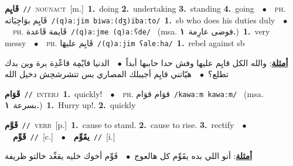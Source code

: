 \documentclass[10pt,a4paper,twoside]{article} %
\begin{document}
\begin{multicols}{2}
{\setlength\topsep{0pt}\textbf{\foreignlanguage{arabic}{قَايِم}}\ {\color{gray}\texttt{//}\color{black}}\ \textsc{noun\textunderscore act}\ [m.]\ \textbf{1.}~doing  \textbf{2.}~undertaking  \textbf{3.}~standing  \textbf{4.}~going\ \ $\bullet$\ \ \textsc{ph.} \color{gray} \foreignlanguage{arabic}{قَايِم بوَاجِبَاته}\color{black}\ {\color{gray}\texttt{/{\sffamily (q)aːjim biwaː(dʒ)ibaːto}/}\color{black}}\ \textbf{1.}~sb who does his duties duly\ \ $\bullet$\ \ \textsc{ph.} \color{gray} \foreignlanguage{arabic}{قَايمة قَاعدة}\color{black}\ {\color{gray}\texttt{/{\sffamily (q)aːjme (q)aːʕde}/}\color{black}}\ \color{gray} (msa. \foreignlanguage{arabic}{فوضى عارِمة}~\foreignlanguage{arabic}{\textbf{١.}})\color{black}\ \textbf{1.}~very messy\ \ $\bullet$\ \ \textsc{ph.} \color{gray} \foreignlanguage{arabic}{قَايِم عليهَا}\color{black}\ {\color{gray}\texttt{/{\sffamily (q)aːjim ʕaleːha}/}\color{black}}\ \textbf{1.}~rebel against sb\  \begin{flushright}\color{gray}\foreignlanguage{arabic}{\textbf{\underline{\foreignlanguage{arabic}{أمثلة}}}: والله الكل قايِم عليها وفش حدا حاببها أبداً\ $\bullet$\ \  الدنيا قايْمِة قاعْدِة برة وين بدك تطلع؟\ $\bullet$\ \  هيّاتني قايِم أجيبلك المصاري بس تتشرشحِش دخيل الله}\end{flushright}\color{black}} \vspace{2mm}

{\setlength\topsep{0pt}\textbf{\foreignlanguage{arabic}{قَوَام}}\ {\color{gray}\texttt{//}\color{black}}\ \textsc{interj}\ \textbf{1.}~quickly!\ \ $\bullet$\ \ \textsc{ph.} \color{gray} \foreignlanguage{arabic}{قوَام قوَام}\color{black}\ {\color{gray}\texttt{/{\sffamily kawaːm kawaːm}/}\color{black}}\ \color{gray} (msa. \foreignlanguage{arabic}{بسرعة}~\foreignlanguage{arabic}{\textbf{١.}})\color{black}\ \textbf{1.}~Hurry up!.  \textbf{2.}~quickly\ } \vspace{2mm}

{\setlength\topsep{0pt}\textbf{\foreignlanguage{arabic}{قَوَّم}}\ {\color{gray}\texttt{//}\color{black}}\ \textsc{verb}\ [p.]\ \textbf{1.}~cause to stand.  \textbf{2.}~cause to rise.  \textbf{3.}~rectify\ \ $\bullet$\ \ \setlength\topsep{0pt}\textbf{\foreignlanguage{arabic}{قَوِّم}}\ {\color{gray}\texttt{//}\color{black}}\ [c.]\ \ $\bullet$\ \ \setlength\topsep{0pt}\textbf{\foreignlanguage{arabic}{يقَوِّم}}\ {\color{gray}\texttt{//}\color{black}}\ [i.]\  \begin{flushright}\color{gray}\foreignlanguage{arabic}{\textbf{\underline{\foreignlanguage{arabic}{أمثلة}}}: أنو اللي بده يقَوِّم كل هالعوج\ $\bullet$\ \  قَوِّم أخوك خليه يقعِّد خالتو ظريفة}\end{flushright}\color{black}} \vspace{2mm}


\end{multicols}
\end{document}
